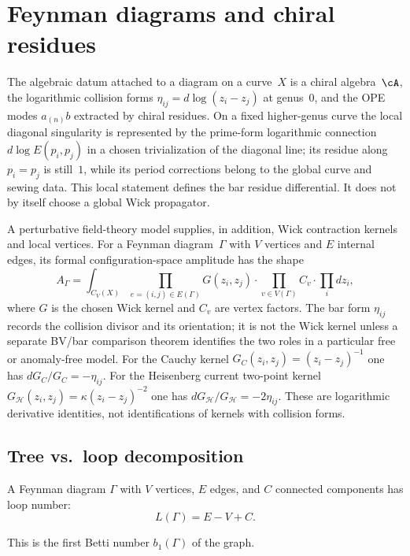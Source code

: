 
\section{Feynman diagrams and chiral residues}

\begin{definition}
\label{def:worldline-intro}
The algebraic datum attached to a diagram on a curve~$X$ is a chiral
algebra~$\cA$, the logarithmic collision forms
$\eta_{ij}=d\log(z_i-z_j)$ at genus~$0$, and the OPE modes
$a_{(n)}b$ extracted by chiral residues.  On a fixed higher-genus curve
the local diagonal singularity is represented by the prime-form
logarithmic connection $d\log E(p_i,p_j)$ in a chosen trivialization of
the diagonal line; its residue along $p_i=p_j$ is still~$1$, while its
period corrections belong to the global curve and sewing data.  This
local statement defines the bar residue differential.  It does not by
itself choose a global Wick propagator.

A perturbative field-theory model supplies, in addition, Wick
contraction kernels and local vertices.  For a Feynman diagram~$\Gamma$
with $V$ vertices and $E$ internal edges, its formal configuration-space
amplitude has the shape
\[
A_\Gamma = \int_{C_V(X)}
\prod_{e=(i,j) \in E(\Gamma)} G(z_i,z_j)
\cdot \prod_{v \in V(\Gamma)} C_v
\cdot \prod_i dz_i,
\]
where $G$ is the chosen Wick kernel and $C_v$ are vertex factors.  The
bar form $\eta_{ij}$ records the collision divisor and its orientation;
it is not the Wick kernel unless a separate BV/bar comparison theorem
identifies the two roles in a particular free or anomaly-free model.
For the Cauchy kernel $G_C(z_i,z_j)=(z_i-z_j)^{-1}$ one has
$dG_C/G_C=-\eta_{ij}$.  For the Heisenberg current two-point kernel
$G_{\mathcal H}(z_i,z_j)=\kappa(z_i-z_j)^{-2}$ one has
$dG_{\mathcal H}/G_{\mathcal H}=-2\eta_{ij}$.  These are logarithmic
derivative identities, not identifications of kernels with collision
forms.
\end{definition}

\subsection{Tree vs.\ loop decomposition}

\begin{definition}
A Feynman diagram $\Gamma$ with $V$ vertices, $E$ edges, and $C$ connected
components has loop number:
\[
L(\Gamma) = E - V + C.
\]

This is the first Betti number $b_1(\Gamma)$ of the graph.
\end{definition}

